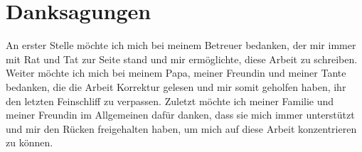 \documentclass[
	ngerman,
	11pt,
	twoside,
	a4paper,
	headsepline,
	footsepline, 
	toc=bib
]{scrbook}
\begin{document}
    \printindex


\chapter*{Danksagungen}

An erster Stelle möchte ich mich bei meinem Betreuer bedanken, der mir immer mit Rat und Tat zur Seite stand und mir ermöglichte, diese Arbeit zu schreiben.
Weiter möchte ich mich bei meinem Papa, meiner Freundin und meiner Tante bedanken, die die Arbeit Korrektur gelesen und mir somit geholfen haben, ihr den letzten Feinschliff zu verpassen.
Zuletzt möchte ich meiner Familie und meiner Freundin im Allgemeinen dafür danken, dass sie mich immer unterstützt und mir den Rücken freigehalten haben, um mich auf diese Arbeit konzentrieren zu können.

\thispagestyle{empty}
\end{document}
